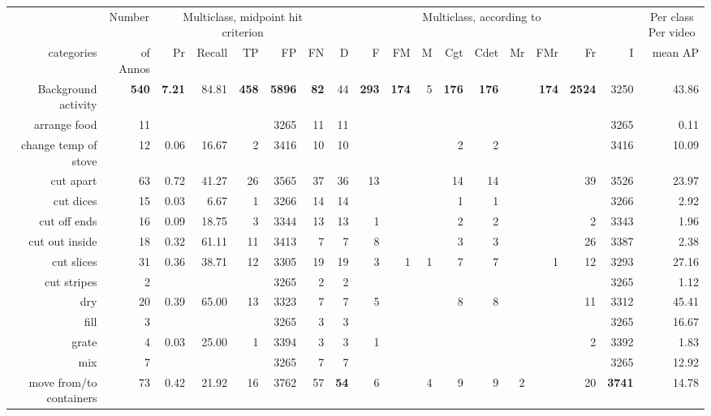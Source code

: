 \begin{tabular}{r r r@{\ \ }r@{\ \ }r@{\ \ }r@{\ \ }r r@{\ \ }r@{\ \ }r@{\ \ }r@{\ \ }r@{\ \ }r@{\ \ }r@{\ \ }r@{\ \ }r@{\ \ }r r}
\toprule  & \multicolumn{1}{c}{Number}  & \multicolumn{5}{c}{Multiclass, midpoint hit criterion}  & \multicolumn{10}{c}{Multiclass, according to~\cite{ward11tist}}  & \multicolumn{1}{c}{Per class Per video} \\
categories&of Annos&Pr&Recall&TP&FP&FN&D&F&FM&M&Cgt&Cdet&Mr&FMr&Fr&I&mean AP\\
\cmidrule(lr){1-1} \cmidrule(lr){2-2} \cmidrule(lr){3-7} \cmidrule(lr){8-17} \cmidrule(lr){18-18}
 Background activity & \textbf{540} & \textbf{7.21} & 84.81 & \textbf{458} & \textbf{5896} & \textbf{82} & 44 & \textbf{293} & \textbf{174} & 5 & \textbf{176} & \textbf{176} &  & \textbf{174} & \textbf{2524} & 3250 & 43.86 \\
arrange food & 11 &  &  &  & 3265 & 11 & 11 &  &  &  &  &  &  &  &  & 3265 & 0.11 \\
change temp of stove & 12 & 0.06 & 16.67 & 2 & 3416 & 10 & 10 &  &  &  & 2 & 2 &  &  &  & 3416 & 10.09 \\
cut apart & 63 & 0.72 & 41.27 & 26 & 3565 & 37 & 36 & 13 &  &  & 14 & 14 &  &  & 39 & 3526 & 23.97 \\
cut dices & 15 & 0.03 & 6.67 & 1 & 3266 & 14 & 14 &  &  &  & 1 & 1 &  &  &  & 3266 & 2.92 \\
cut off ends & 16 & 0.09 & 18.75 & 3 & 3344 & 13 & 13 & 1 &  &  & 2 & 2 &  &  & 2 & 3343 & 1.96 \\
cut out inside & 18 & 0.32 & 61.11 & 11 & 3413 & 7 & 7 & 8 &  &  & 3 & 3 &  &  & 26 & 3387 & 2.38 \\
cut slices & 31 & 0.36 & 38.71 & 12 & 3305 & 19 & 19 & 3 & 1 & 1 & 7 & 7 &  & 1 & 12 & 3293 & 27.16 \\
cut stripes & 2 &  &  &  & 3265 & 2 & 2 &  &  &  &  &  &  &  &  & 3265 & 1.12 \\
dry & 20 & 0.39 & 65.00 & 13 & 3323 & 7 & 7 & 5 &  &  & 8 & 8 &  &  & 11 & 3312 & 45.41 \\
fill & 3 &  &  &  & 3265 & 3 & 3 &  &  &  &  &  &  &  &  & 3265 & 16.67 \\
grate & 4 & 0.03 & 25.00 & 1 & 3394 & 3 & 3 & 1 &  &  &  &  &  &  & 2 & 3392 & 1.83 \\
mix & 7 &  &  &  & 3265 & 7 & 7 &  &  &  &  &  &  &  &  & 3265 & 12.92 \\
move from/to containers & 73 & 0.42 & 21.92 & 16 & 3762 & 57 & \textbf{54} & 6 &  & 4 & 9 & 9 & 2 &  & 20 & \textbf{3741} & 14.78 \\

\end{tabular}

